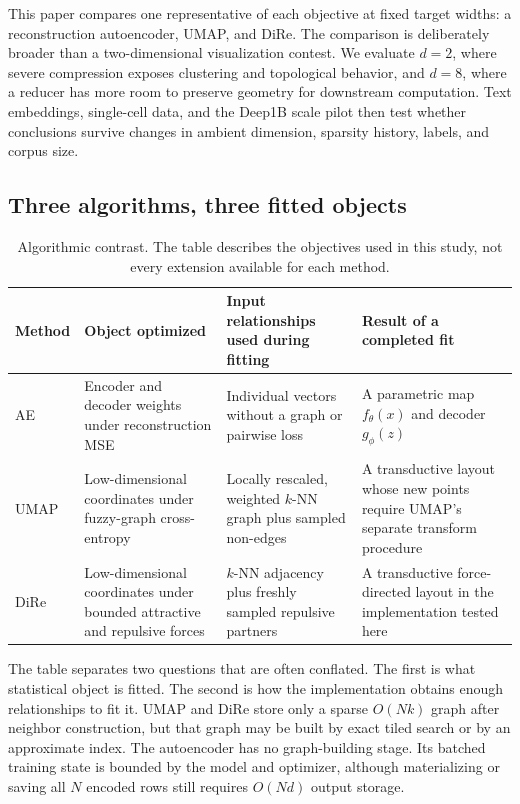 \documentclass[10pt]{article}
\newcommand{\AEmethod}{\textsc{AE}}
\begin{document}
This paper compares one representative of each objective at fixed target widths:
a reconstruction autoencoder, UMAP, and DiRe.  The comparison is deliberately broader
than a two-dimensional visualization contest.  We evaluate $d=2$, where severe
compression exposes clustering and topological behavior, and $d=8$, where a reducer has
more room to preserve geometry for downstream computation.  Text embeddings,
single-cell data, and the Deep1B scale pilot then test whether conclusions survive
changes in ambient dimension, sparsity history, labels, and corpus size.

\subsection{Three algorithms, three fitted objects}

\begin{table}[H]
\centering
\small
\begin{tabular}{@{}p{}p{}p{}p{}@{}}
\toprule
Method & Object optimized & Input relationships used during fitting &
Result of a completed fit\\
\midrule
\AEmethod & Encoder and decoder weights under reconstruction MSE &
Individual vectors without a graph or pairwise loss &
A parametric map $f_\theta(x)$ and decoder $g_\phi(z)$\\
UMAP & Low-dimensional coordinates under fuzzy-graph cross-entropy &
Locally rescaled, weighted $k$-NN graph plus sampled non-edges &
A transductive layout whose new points require UMAP's separate transform procedure\\
DiRe & Low-dimensional coordinates under bounded attractive and repulsive forces &
$k$-NN adjacency plus freshly sampled repulsive partners &
A transductive force-directed layout in the implementation tested here\\
\bottomrule
\end{tabular}
\caption{Algorithmic contrast.  The table describes the objectives used in this study,
not every extension available for each method.}
\label{tab:algorithmic-contrast}
\end{table}

The table separates two questions that are often conflated.  The first is what
statistical object is fitted.  The second is how the implementation obtains enough
relationships to fit it.  UMAP and DiRe store only a sparse $O(Nk)$ graph after neighbor
construction, but that graph may be built by exact tiled search or by an approximate
index.  The autoencoder has no graph-building stage.  Its batched training state is
bounded by the model and optimizer, although materializing or saving all $N$ encoded
rows still requires $O(Nd)$ output storage.
\end{document}
